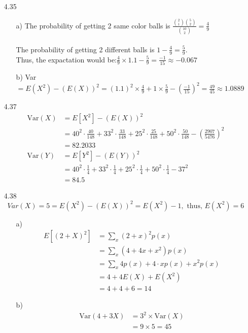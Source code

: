 \documentclass{article}
\begin{document}
\begin{itemize}
    \newpage
    \item [4.35] \
    \begin{itemize}
        \item [a)] The probability of getting 2 same color balls is \(\frac{\binom{2}{1}\binom{5}{2}}{\binom{10}{2}} = \frac{4}{9}\)\\
                   \\The probability of getting 2 different  balls is \(1-\frac{4}{9} = \frac{5}{9}\).
                   \\Thus, the expactation would be:\(\frac{4}{9}\times 1.1-\frac{5}{9} = \frac{-1}{15}\approx -0.067\)
        \item [b)] Var\( = E(X^2)-(E(X))^2 = (1.1)^2\times\frac{4}{9}+1\times\frac{5}{9}-(\frac{-1}{15})^2=\frac{49}{45}\approx1.0889\)
    \end{itemize}
    \item [4.37] \begin{align*}
            \text{Var}(X)&=E[X^2]-(E(X))^2 \\
                &= 40^2\cdot\frac{40}{148}+33^2\cdot\frac{33}{148}+25^2\cdot\frac{25}{148}+50^2\cdot\frac{50}{148}-\left(\frac{2907}{5476}\right)^2\\
               & =82.2033\\
            \text{Var}(Y)&=E[Y^2]-(E(Y))^2 \\
            &=40^2\cdot\frac{1}{4}+33^2\cdot\frac{1}{4}+25^2\cdot\frac{1}{4}+50^2\cdot\frac{1}{4} - 37^2\\
            &=84.5
    \end{align*}
    \item [4.38] \[Var(X) = 5 = E(X^2)-(E(X))^2 = E(X^2) - 1, \text{ thus, }E(X^2) = 6\]
    \begin{itemize}
        \item [a)] \begin{align*}
            E[(2+X)^2]&= \sum_x(2+x)^2p(x)\\
            &=\sum_x (4+4x+x^2)p(x)\\
            &=\sum_x 4p(x) + 4\cdot xp(x)+x^2p(x)\\
            &=4+4E(X)+E(X^2)\\
            &=4+4+6 = 14
        \end{align*}
        \item [b)] \begin{align*}
            \text{Var}(4+3X)&=3^2\times \text{Var}(X)\\
            &=9\times 5 = 45

\end{align*}
\end{itemize}
\end{itemize}
\end{document}
